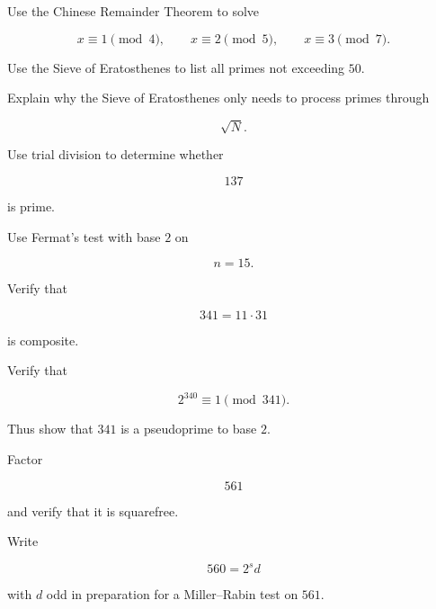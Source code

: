 \begin{exercise}[2]
Use the Chinese Remainder Theorem to solve

\[ x\equiv1\pmod4,\qquad x\equiv2\pmod5,\qquad x\equiv3\pmod7. \]
\end{exercise}

\begin{exercise}[1]
Use the Sieve of Eratosthenes to list all primes not exceeding \(50\).
\end{exercise}

\begin{exercise}[2]
Explain why the Sieve of Eratosthenes only needs to process primes through

\[ \sqrt N. \]
\end{exercise}

\begin{exercise}[1]
Use trial division to determine whether

\[ 137 \]

is prime.
\end{exercise}

\begin{exercise}[2]
Use Fermat's test with base \(2\) on

\[ n=15. \]
\end{exercise}

\begin{exercise}[2]
Verify that

\[ 341=11\cdot31 \]

is composite.
\end{exercise}

\begin{exercise}[3]
Verify that

\[ 2^{340}\equiv1\pmod{341}. \]

Thus show that \(341\) is a pseudoprime to base \(2\).
\end{exercise}

\begin{exercise}[2]
Factor

\[ 561 \]

and verify that it is squarefree.
\end{exercise}

\begin{exercise}[2]
Write

\[ 560=2^sd \]

with \(d\) odd in preparation for a Miller--Rabin test on \(561\).
\end{exercise}

